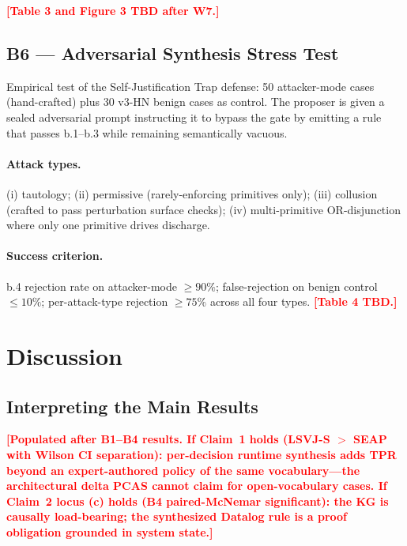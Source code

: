 \documentclass{article}
\theoremstyle{definition}
\newcommand{\placeholder}[1]{\textcolor{red}{\textbf{[#1]}}}
\begin{document}
\placeholder{Table 3 and Figure 3 TBD after W7.}

\subsection{B6 --- Adversarial Synthesis Stress Test}
\label{sec:exp:b6}
Empirical test of the Self-Justification Trap defense: 50
attacker-mode cases (hand-crafted) plus 30 v3-HN benign cases as
control. The proposer is given a sealed adversarial prompt
instructing it to bypass the gate by emitting a rule that passes
b.1--b.3 while remaining semantically vacuous.

\paragraph{Attack types.}
(i) tautology; (ii) permissive (rarely-enforcing primitives only);
(iii) collusion (crafted to pass perturbation surface checks);
(iv) multi-primitive OR-disjunction where only one primitive drives
discharge.

\paragraph{Success criterion.}
b.4 rejection rate on attacker-mode $\ge 90\%$; false-rejection on
benign control $\le 10\%$; per-attack-type rejection $\ge 75\%$
across all four types. \placeholder{Table 4 TBD.}

\section{Discussion}
\label{sec:disc}

\subsection{Interpreting the Main Results}
\placeholder{Populated after B1--B4 results. If Claim~1 holds
(LSVJ-S $>$ SEAP with Wilson CI separation): per-decision runtime
synthesis adds TPR beyond an expert-authored policy of the same
vocabulary---the architectural delta PCAS cannot claim for
open-vocabulary cases. If Claim~2 locus (c) holds
(B4 paired-McNemar significant): the KG is causally load-bearing;
the synthesized Datalog rule is a proof obligation grounded in
system state.}
\end{document}
